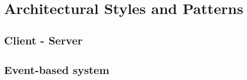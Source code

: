 \section{Architectural Styles and Patterns}
\subsection{Client - Server}
\subsection{Event-based system}